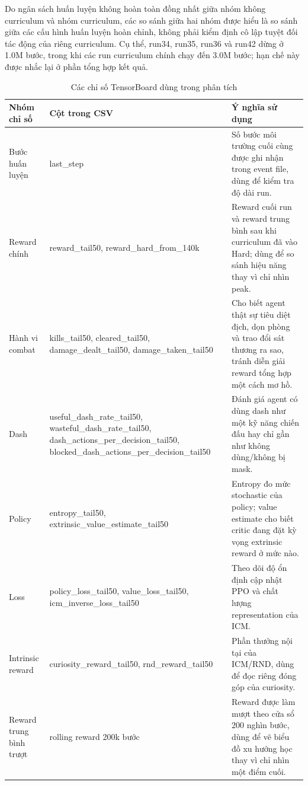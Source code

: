 Do ngân sách huấn luyện không hoàn toàn đồng nhất giữa nhóm không curriculum và nhóm curriculum, các so sánh giữa hai nhóm được hiểu là so sánh giữa các cấu hình huấn luyện hoàn chỉnh, không phải kiểm định cô lập tuyệt đối tác động của riêng curriculum. Cụ thể, run34, run35, run36 và run42 dừng ở 1.0M bước, trong khi các run curriculum chính chạy đến 3.0M bước; hạn chế này được nhắc lại ở phần tổng hợp kết quả.
\begin{table}[H]
    \centering
    \small
    \setlength{\tabcolsep}{4pt}
    \renewcommand{\arraystretch}{1.25}
    \caption{Các chỉ số TensorBoard dùng trong phân tích}
    \label{tab:tensorboard_metrics}
    \begin{tabular}{|>{\raggedright\arraybackslash}p{3.4cm}|>{\raggedright\arraybackslash}p{6.2cm}|>{\raggedright\arraybackslash}p{6.2cm}|}
        \hline
        \textbf{Nhóm chỉ số} & \textbf{Cột trong CSV} & \textbf{Ý nghĩa sử dụng} \\
        \hline
        Bước huấn luyện & last\_step & Số bước môi trường cuối cùng được ghi nhận trong event file, dùng để kiểm tra độ dài run. \\
        \hline
        Reward chính & reward\_tail50, reward\_hard\_from\_140k & Reward cuối run và reward trung bình sau khi curriculum đã vào Hard; dùng để so sánh hiệu năng thay vì chỉ nhìn peak. \\
        \hline
        Hành vi combat & kills\_tail50, cleared\_tail50, damage\_dealt\_tail50, damage\_taken\_tail50 & Cho biết agent thật sự tiêu diệt địch, dọn phòng và trao đổi sát thương ra sao, tránh diễn giải reward tổng hợp một cách mơ hồ. \\
        \hline
        Dash & useful\_dash\_rate\_tail50, wasteful\_dash\_rate\_tail50, dash\_actions\_per\_decision\_tail50, blocked\_dash\_actions\_per\_decision\_tail50 & Đánh giá agent có dùng dash như một kỹ năng chiến đấu hay chỉ gần như không dùng/không bị mask. \\
        \hline
        Policy & entropy\_tail50, extrinsic\_value\_estimate\_tail50 & Entropy đo mức stochastic của policy; value estimate cho biết critic đang đặt kỳ vọng extrinsic reward ở mức nào. \\
        \hline
        Loss & policy\_loss\_tail50, value\_loss\_tail50, icm\_inverse\_loss\_tail50 & Theo dõi độ ổn định cập nhật PPO và chất lượng representation của ICM. \\
        \hline
        Intrinsic reward & curiosity\_reward\_tail50, rnd\_reward\_tail50 & Phần thưởng nội tại của ICM/RND, dùng để đọc riêng đóng góp của curiosity. \\
        \hline
        Reward trung bình trượt & rolling reward 200k bước & Reward được làm mượt theo cửa sổ 200 nghìn bước, dùng để vẽ biểu đồ xu hướng học thay vì chỉ nhìn một điểm cuối. \\
        \hline
    \end{tabular}
\end{table}

